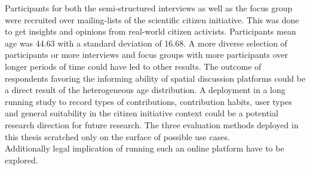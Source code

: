 Participants for both the semi-structured interviews as well as the focus group were recruited over mailing-lists of the scientific citizen initiative. This was done to get insights and opinions from real-world citizen activists. Participants mean age was 44.63 with a standard deviation of 16.68. A more diverse selection of participants or more interviews and focus groups with more participants over longer periods of time could have led to other results. The outcome of respondents favoring the informing ability of spatial discussion platforms could be a direct result of the heterogeneous age distribution. A deployment in a long running study to record types of contributions, contribution habits, user types and general suitability in the citizen initiative context could be a potential research direction for future research. The three evaluation methods deployed in this thesis scratched only on the surface of possible use cases.\\
Additionally legal implication of running such an online platform have to be explored.
